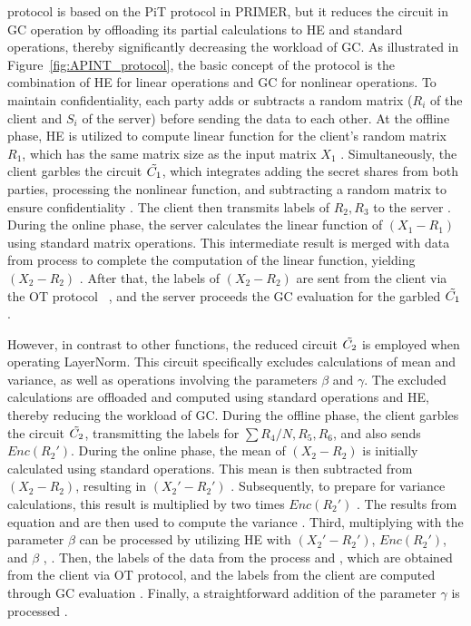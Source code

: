 \sysname protocol is based on the PiT protocol in PRIMER, but it reduces the circuit in GC operation by offloading its partial calculations to HE and standard operations, thereby significantly decreasing the workload of GC. As illustrated in Figure~\ref{fig:APINT_protocol}, the basic concept of the protocol is the combination of HE for linear operations and GC for nonlinear operations. To maintain confidentiality, each party adds or subtracts a random matrix ($R_i$ of the client and $S_i$ of the server) before sending the data to each other.
At the offline phase, HE is utilized to compute linear function for the client's random matrix $R_{1}$, which has the same matrix size as the input matrix $X_1$ . Simultaneously, the client garbles the circuit $\Tilde{C_1}$, which integrates adding the secret shares from both parties, processing the nonlinear function, and subtracting a random matrix to ensure confidentiality . The client then transmits labels of $R_2, R_3$ to the server . During the online phase, the server calculates the linear function of $(X_{1}-R_{1})$ using standard matrix operations. This intermediate result is merged with data from process  to complete the computation of the linear function, yielding $(X_{2}-R_{2})$ . After that, the labels of $(X_{2}-R_{2})$ are sent from the client via the OT protocol~\cite{ishai2003extending} , and the server proceeds the GC evaluation for the garbled $\Tilde{C_1}$ .




However, in contrast to other functions, the reduced circuit $\Tilde{C_2}$ is employed when operating LayerNorm. This circuit specifically excludes calculations of mean and variance, as well as operations involving the parameters $\beta$ and $\gamma$. The excluded calculations are offloaded and computed using standard operations and HE, thereby reducing the workload of GC.
During the offline phase, the client garbles the circuit $\Tilde{C_2}$, transmitting the labels for $\sum{R_4/N}, R_5, R_6$, and also sends $Enc(R_2')$.
During the online phase, the mean of $(X_{2}-R_{2})$ is initially calculated using standard operations. This mean is then subtracted from $(X_{2}-R_{2})$, resulting in $(X_{2}'-R_{2}')$ . Subsequently, to prepare for variance calculations, this result is multiplied by two times $Enc(R_2')$ . The results from equation  and  are then used to compute the variance . Third, multiplying with the parameter $\beta$ can be processed by utilizing HE with $(X_{2}'-R_{2}')$, $Enc(R_2')$, and $\beta$ , . Then, the labels of the data from the process  and , which are obtained from the client via OT protocol, and the labels from the client are computed through GC evaluation . Finally, a straightforward addition of the parameter $\gamma$ is processed .


